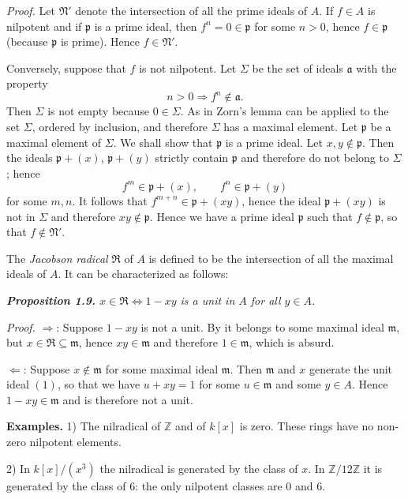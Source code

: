 \noindent\emph{Proof.}  Let $\mathfrak N'$ denote the intersection of all the prime ideals of $A$.  If $f\in A$ is
nilpotent and if $\mathfrak p$ is a prime ideal, then $f^n=0\in\mathfrak p$ for some $n>0$, hence
$f\in\mathfrak p$ (because $\mathfrak p$ is prime).  Hence $f\in\mathfrak N'$.

Conversely, suppose that $f$ is not nilpotent.  Let $\Sigma$ be the set of ideals $\mathfrak a$
with the property
\[
n>0\Rightarrow f^n\notin\mathfrak a.
\]
Then $\Sigma$ is not empty because $0\in\Sigma$.  As in  Zorn's lemma can be applied
to the set $\Sigma$, ordered by inclusion, and therefore $\Sigma$ has a maximal element.  Let
$\mathfrak p$ be a maximal element of $\Sigma$.  We shall show that $\mathfrak p$ is a prime ideal.  Let
$x,y\notin\mathfrak p$.  Then the ideals $\mathfrak p+(x)$, $\mathfrak p+(y)$ strictly contain $\mathfrak p$ and therefore do
not belong to $\Sigma$; hence
\[
f^m\in\mathfrak p+(x),\qquad f^n\in\mathfrak p+(y)
\]
for some $m,n$.  It follows that $f^{m+n}\in\mathfrak p+(xy)$, hence the ideal $\mathfrak p+(xy)$ is not
in $\Sigma$ and therefore $xy\notin\mathfrak p$.  Hence we have a prime ideal $\mathfrak p$ such that $f\notin\mathfrak p$, so that
$f\notin\mathfrak N'$.\proofbox

The \emph{Jacobson radical} $\mathfrak R$ of $A$ is defined to be the intersection of all the maximal ideals of $A$.  It can be characterized as follows:

\medskip
\noindent\textit{\textbf{Proposition 1.9.} $x\in\mathfrak R\Longleftrightarrow1-xy$ is a unit in $A$ for all $y\in A$.}

\noindent\emph{Proof.}  $\Rightarrow$: Suppose $1-xy$ is not a unit.  By  it belongs to some maximal
ideal $\mathfrak m$, but $x\in\mathfrak R\subseteq\mathfrak m$, hence $xy\in\mathfrak m$ and therefore $1\in\mathfrak m$, which is absurd.

$\Leftarrow$: Suppose $x\notin\mathfrak m$ for some maximal ideal $\mathfrak m$.  Then $\mathfrak m$ and $x$ generate the
unit ideal $(1)$, so that we have $u+xy=1$ for some $u\in\mathfrak m$ and some $y\in A$.
Hence $1-xy\in\mathfrak m$ and is therefore not a unit.\proofbox

\textline
\noindent\textbf{Examples.} 1) The nilradical of $\mathbb Z$ and of $k[x]$ is
zero.  These rings have no non-zero nilpotent elements.

2) In $k[x]/(x^3)$ the nilradical is generated by the class of $x$.  In
$\mathbb Z/12\mathbb Z$ it is generated by the class of $6$: the only
nilpotent classes are $0$ and $6$.

